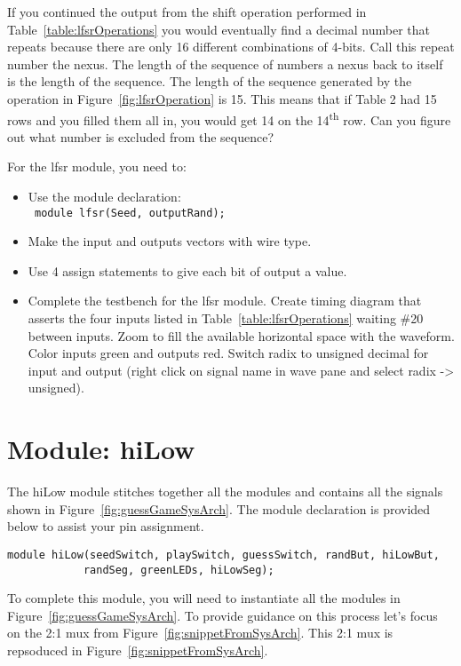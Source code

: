 If you continued the output from the shift operation performed in Table~\ref{table:lfsrOperations} 
you would eventually find a decimal number that repeats because there
are only 16 different combinations of 4-bits. Call this repeat number
the nexus. The length of the sequence of numbers a nexus back to itself
is the length of the sequence. The length of the sequence generated by
the operation in Figure~\ref{fig:lfsrOperation} is 15. This means that if Table 2 had 15 rows
and you filled them all in, you would get 14 on the
14\textsuperscript{th} row. Can you figure out what number is excluded
from the sequence?

For the lfsr module, you need to:

\begin{itemize}
\item
  Use the module declaration:\\
\verb+ module lfsr(Seed, outputRand);+

\item
  Make the input and outputs vectors with wire type.
\item
  \protect\hypertarget{lfsr_verilog}{}{}Use 4 assign statements to give
  each bit of output a value.
\item
  \protect\hypertarget{lfsr_testbench}{}{}Complete the testbench for the
  lfsr module. Create timing diagram that asserts the four inputs listed
  in Table~\ref{table:lfsrOperations} 
  waiting \#20 between inputs. Zoom to fill the available
  horizontal space with the waveform. Color inputs green and outputs
  red. Switch radix to unsigned decimal for input and output (right
  click on signal name in wave pane and select radix -\textgreater{}
  unsigned).
\end{itemize}

\section{Module: hiLow}

The hiLow module stitches together all the modules and contains all 
the signals shown in
Figure~\ref{fig:guessGameSysArch}. The module declaration is provided 
below to assist your pin assignment.

\begin{verbatim}
module hiLow(seedSwitch, playSwitch, guessSwitch, randBut, hiLowBut,
			randSeg, greenLEDs, hiLowSeg);
\end{verbatim}

To complete this module, you will need to instantiate all the modules in
Figure~\ref{fig:guessGameSysArch}. To provide guidance on this process
let's focus on the 2:1 mux from Figure~\ref{fig:snippetFromSysArch}.  This
2:1 mux is repsoduced in Figure~\ref{fig:snippetFromSysArch}.


